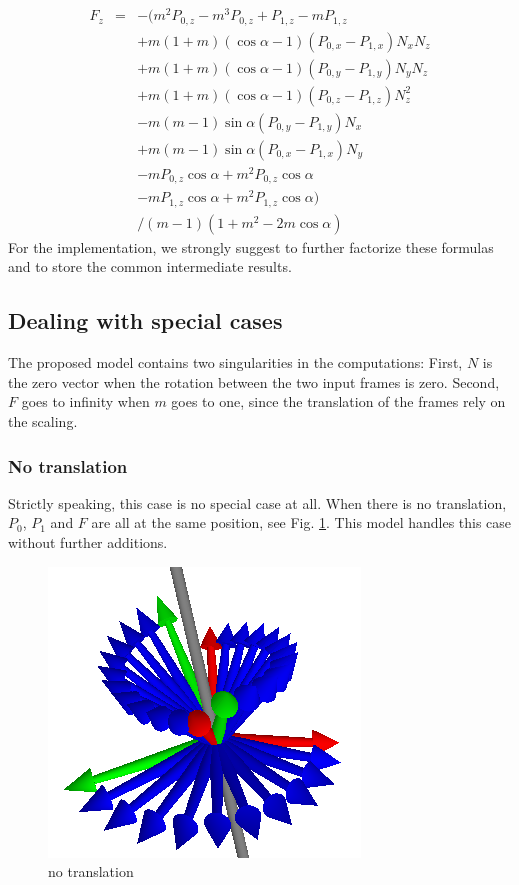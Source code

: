 \documentclass[journal, letterpaper]{IEEEtran}
\begin{document}
\begin{equation}
\begin{array}{lcl}
 F_z &=& -(m^2 P_{0,z} - m^3 P_{0,z} + P_{1,z} - m P_{1,z} \\
		&& + m (1+m) (\cos\alpha - 1) (P_{0,x} - P_{1,x}) N_x N_z \\
		&& + m (1+m) (\cos\alpha - 1) (P_{0,y} - P_{1,y}) N_y N_z \\
		&& + m (1+m) (\cos\alpha - 1) (P_{0,z} - P_{1,z}) N_z^2 \\
		&& - m (m-1) \sin\alpha (P_{0,y} - P_{1,y}) N_x \\
		&& + m (m-1) \sin\alpha (P_{0,x} - P_{1,x}) N_y \\
		&& - m P_{0,z} \cos\alpha + m^2 P_{0,z} \cos\alpha \\
		&& - m P_{1,z} \cos\alpha + m^2 P_{1,z} \cos\alpha) \\
		&& / (m-1)(1 + m^2 - 2m\cos\alpha)
\end{array}
\label{eq:Fz}
\end{equation}
For the implementation, we strongly suggest to further factorize these formulas and to store the common intermediate results.

\subsection{Dealing with special cases}
The proposed model contains two singularities in the computations: 
First, $N$ is the zero vector when the rotation between the two input frames is zero.
Second, $F$ goes to infinity when $m$ goes to one, since the translation of the frames rely on the scaling.

\subsubsection{No translation}
Strictly speaking, this case is no special case at all. When there is no translation, $P_0$, $P_1$ and $F$ are all at the same position, see Fig. \ref{fig:P8}. This model handles this case without further additions.
\begin{figure}
	\centering
		\includegraphics[scale=0.4]{pictures/P8.png}
	\caption{no translation}
	\label{fig:P8}
\end{figure}
\end{document}
